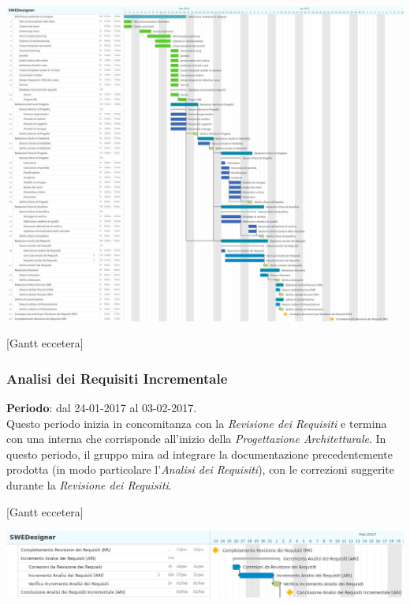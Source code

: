 	
	{\includegraphics[width=16cm]{img/ganttan.jpg}\par}
		
		
	[Gantt eccetera]
	\subsubsection{Analisi dei Requisiti Incrementale} \label{sec:ARI}
	\textbf{Periodo}: dal 24-01-2017 al 03-02-2017.
	\\ Questo periodo inizia in concomitanza con la \emph{Revisione dei Requisiti} e termina con una  interna che corrisponde all'inizio della \emph{Progettazione Architetturale}. In questo periodo, il gruppo mira ad integrare la documentazione precedentemente prodotta (in modo particolare l'\emph{Analisi dei Requisiti}), con le correzioni suggerite durante la \emph{Revisione dei Requisiti}.

	[Gantt eccetera]
	{\includegraphics[width=15cm]{img/ganttari.png}\par}

	
